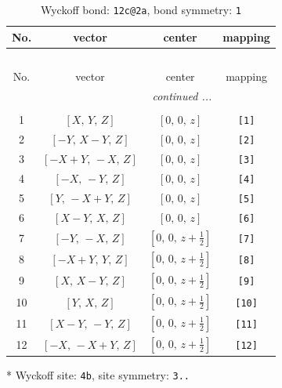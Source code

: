 \documentclass[fleqn,8pt]{jsarticle}
\begin{document}
\begin{longtable}{cccc}
\caption{Wyckoff bond: {\tt 12c@2a}, bond symmetry: {\tt 1}}
 \\
 \hline \hline
No. & vector & center & mapping \\ \hline \endfirsthead

\multicolumn{3}{l}{\tablename\ \thetable{}} \\
 \hline \hline
No. & vector & center & mapping \\ \hline \endhead

 \hline \hline
\multicolumn{3}{r}{\footnotesize\it continued ...} \\ \endfoot

 \hline \hline
\multicolumn{3}{r}{} \\ \endlastfoot

1 & $\left[ X,\, Y,\, Z \right]$ & $\left[ 0,\, 0,\, z \right]$ & {\tt [1]} \\ \hline
2 & $\left[ - Y,\, X - Y,\, Z \right]$ & $\left[ 0,\, 0,\, z \right]$ & {\tt [2]} \\ \hline
3 & $\left[ - X + Y,\, - X,\, Z \right]$ & $\left[ 0,\, 0,\, z \right]$ & {\tt [3]} \\ \hline
4 & $\left[ - X,\, - Y,\, Z \right]$ & $\left[ 0,\, 0,\, z \right]$ & {\tt [4]} \\ \hline
5 & $\left[ Y,\, - X + Y,\, Z \right]$ & $\left[ 0,\, 0,\, z \right]$ & {\tt [5]} \\ \hline
6 & $\left[ X - Y,\, X,\, Z \right]$ & $\left[ 0,\, 0,\, z \right]$ & {\tt [6]} \\ \hline
7 & $\left[ - Y,\, - X,\, Z \right]$ & $\left[ 0,\, 0,\, z + \frac{1}{2} \right]$ & {\tt [7]} \\ \hline
8 & $\left[ - X + Y,\, Y,\, Z \right]$ & $\left[ 0,\, 0,\, z + \frac{1}{2} \right]$ & {\tt [8]} \\ \hline
9 & $\left[ X,\, X - Y,\, Z \right]$ & $\left[ 0,\, 0,\, z + \frac{1}{2} \right]$ & {\tt [9]} \\ \hline
10 & $\left[ Y,\, X,\, Z \right]$ & $\left[ 0,\, 0,\, z + \frac{1}{2} \right]$ & {\tt [10]} \\ \hline
11 & $\left[ X - Y,\, - Y,\, Z \right]$ & $\left[ 0,\, 0,\, z + \frac{1}{2} \right]$ & {\tt [11]} \\ \hline
12 & $\left[ - X,\, - X + Y,\, Z \right]$ & $\left[ 0,\, 0,\, z + \frac{1}{2} \right]$ & {\tt [12]} \\
\end{longtable}
* Wyckoff site: {\tt 4b}, site symmetry: {\tt 3..}
\end{document}

